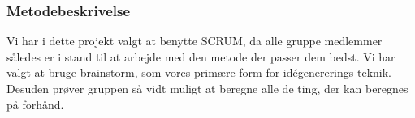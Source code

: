 \subsubsection{Metodebeskrivelse}
Vi har i dette projekt valgt at benytte SCRUM, da alle gruppe medlemmer således er i stand til at arbejde med den metode der passer dem bedst. 
Vi har valgt at bruge brainstorm, som vores primære form for idégenererings-teknik.
Desuden prøver gruppen så vidt muligt at beregne alle de ting, der kan beregnes på forhånd.